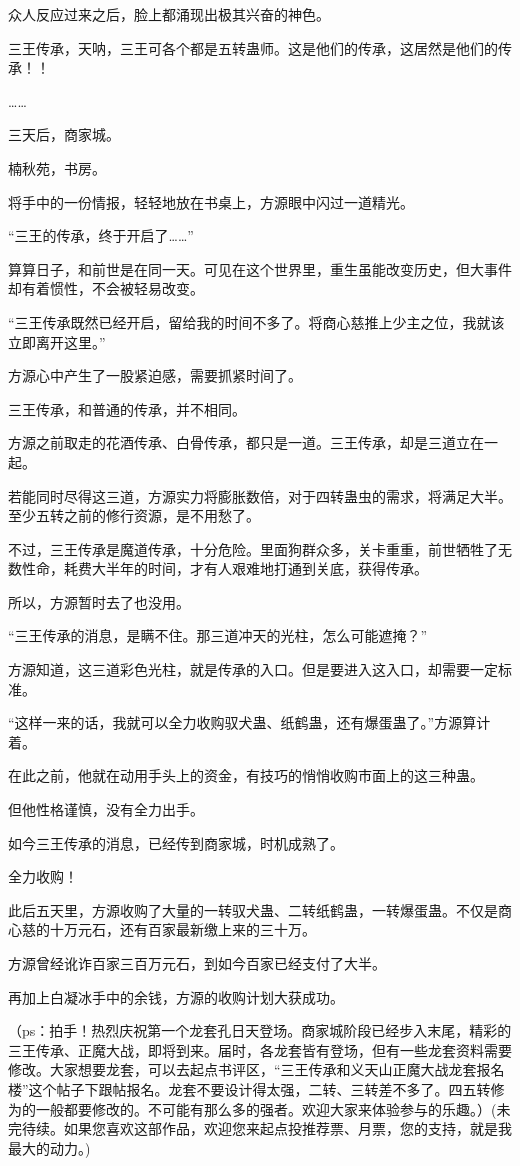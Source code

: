 \begin{this_body}
众人反应过来之后，脸上都涌现出极其兴奋的神色。

三王传承，天呐，三王可各个都是五转蛊师。这是他们的传承，这居然是他们的传承！！

……

三天后，商家城。

楠秋苑，书房。

将手中的一份情报，轻轻地放在书桌上，方源眼中闪过一道精光。

“三王的传承，终于开启了……”

算算日子，和前世是在同一天。可见在这个世界里，重生虽能改变历史，但大事件却有着惯性，不会被轻易改变。

“三王传承既然已经开启，留给我的时间不多了。将商心慈推上少主之位，我就该立即离开这里。”

方源心中产生了一股紧迫感，需要抓紧时间了。

三王传承，和普通的传承，并不相同。

方源之前取走的花酒传承、白骨传承，都只是一道。三王传承，却是三道立在一起。

若能同时尽得这三道，方源实力将膨胀数倍，对于四转蛊虫的需求，将满足大半。至少五转之前的修行资源，是不用愁了。

不过，三王传承是魔道传承，十分危险。里面狗群众多，关卡重重，前世牺牲了无数性命，耗费大半年的时间，才有人艰难地打通到关底，获得传承。

所以，方源暂时去了也没用。

“三王传承的消息，是瞒不住。那三道冲天的光柱，怎么可能遮掩？”

方源知道，这三道彩色光柱，就是传承的入口。但是要进入这入口，却需要一定标准。

“这样一来的话，我就可以全力收购驭犬蛊、纸鹤蛊，还有爆蛋蛊了。”方源算计着。

在此之前，他就在动用手头上的资金，有技巧的悄悄收购市面上的这三种蛊。

但他性格谨慎，没有全力出手。

如今三王传承的消息，已经传到商家城，时机成熟了。

全力收购！

此后五天里，方源收购了大量的一转驭犬蛊、二转纸鹤蛊，一转爆蛋蛊。不仅是商心慈的十万元石，还有百家最新缴上来的三十万。

方源曾经讹诈百家三百万元石，到如今百家已经支付了大半。

再加上白凝冰手中的余钱，方源的收购计划大获成功。

（ps：拍手！热烈庆祝第一个龙套孔日天登场。商家城阶段已经步入末尾，精彩的三王传承、正魔大战，即将到来。届时，各龙套皆有登场，但有一些龙套资料需要修改。大家想要龙套，可以去起点书评区，“三王传承和义天山正魔大战龙套报名楼”这个帖子下跟帖报名。龙套不要设计得太强，二转、三转差不多了。四五转修为的一般都要修改的。不可能有那么多的强者。欢迎大家来体验参与的乐趣。）(未完待续。如果您喜欢这部作品，欢迎您来起点投推荐票、月票，您的支持，就是我最大的动力。)

\end{this_body}

